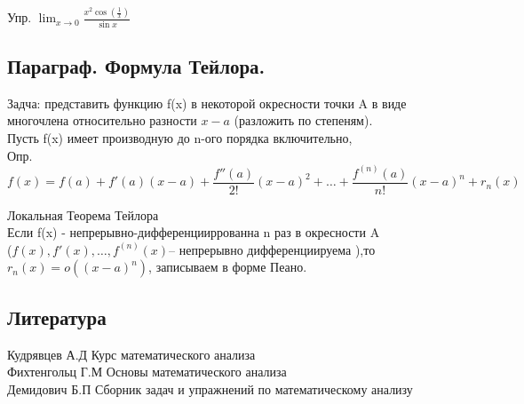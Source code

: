 \documentclass[a4paper, 12pt]{article}
\begin{document}
Упр. $ \lim_{x\to 0} \frac{x^2 \cos(\frac{1}{x})}{\sin x} $

\newpage
\subsection{Параграф. Формула Тейлора.}
Задча: представить функцию f(x) в некоторой окресности точки A в виде многочлена относительно разности $ x - a $ (разложить по степеням).\\

Пусть f(x) имеет производную до n-ого порядка включительно,\\
Опр.
\[
    f(x) = f(a) + f'(a)(x-a) + \frac{f''(a)}{2!}(x-a)^2 + \ldots + \frac{f^{(n)}(a)}{n!}(x-a)^n + r_n(x)
  \]  

\begin{mdframed}[backgroundcolor=blue!20] 
       Локальная Теорема Тейлора\\
       Если f(x) - непрерывно-дифференцииррованна n раз в окресности A\\($ f(x),f'(x),\ldots,f^{(n)}(x) $-- непрерывно дифференциируема ),то $ r_n(x) = o((x-a)^n) $, записываем в форме Пеано.\\
    \end{mdframed}
    









\newpage
\subsection*{Литература}
Кудрявцев А.Д Курс математического анализа\\
Фихтенгольц Г.М Основы математического анализа\\
Демидович Б.П Сборник задач и упражнений по математическому анализу\\
\end{document}
